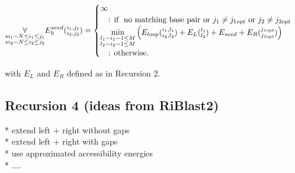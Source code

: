 \begin{equation*}
\underset{\substack{si_{1}-N \le i_{1} \le j_{1}\\si_{2}-N \le i_{2} \le j_{2}}}{\forall}\\
E_{h}^{seed}(\substack{i_1, j_1\\i_2, j_2}) = \begin{cases}
\infty\\
\quad\text{: if } \text{ no matching base pair or $j_1 \neq j_{1opt}$ or $j_2 \neq j_{2opt}$ }\\
\min\limits_{\substack{l_{1} - i_{1} - 1 \le M\\l_{2} - i_{2} - 1 \le M}}
\begin{pmatrix}
E_{loop}(\substack{i_1,l_1\\i_2,l_2}) + E_{L}(\substack{l_1\\l_2}) + E_{seed} + E_{R}(\substack{j_{1opt}\\j_{2opt}})
\end{pmatrix}\\
\quad\text{: otherwise.}\\

\end{cases}
\end{equation*}

with $E_{L}$ and $E_{R}$ defined as in Recursion 2.\\

\clearpage

\subsection{Recursion 4 (ideas from RiBlast2)}

* extend left + right without gaps\\
* extend left + right with gaps\\
* use approximated accessibility energies\\
* ....


